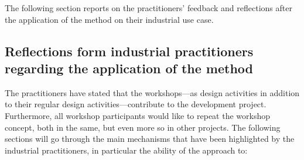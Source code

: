 \documentclass[aerospace,article,submit,moreauthors,pdftex]{Definitions/mdpi}
\newcommand{\Jakob}[1]{{{\color{orange}{\itshape{#1}}\color{black}}
    }{\ignorespaces}}
\begin{document}
\begin{figure}[th!]
\begin{center}
        \label{fig:altGV}
    \end{center}
\end{figure}


The following section reports on the practitioners' feedback and reflections after the application of the method on their industrial use case. 







\subsection{Reflections form industrial practitioners regarding the application of the method} \label{sec:feedback}

The practitioners have stated that the workshops---as design activities in addition to their regular design activities---contribute to the development project.
Furthermore, all workshop participants would like to repeat the workshop concept, both in the same, but even more so in other projects.
The following sections will go through the main mechanisms that have been highlighted by the industrial practitioners, in particular the ability of the approach to:
\end{document}
